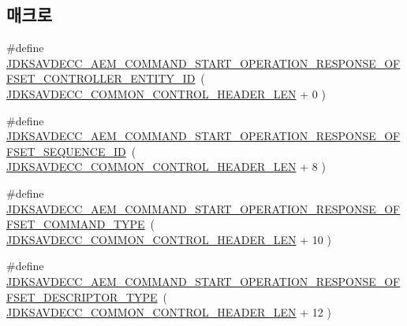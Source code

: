 \subsection*{매크로}
\begin{DoxyCompactItemize}
\item 
\#define \hyperlink{group__command__start__operation__response_ga738a0042fd569fe2e23a629809b88dbd}{J\+D\+K\+S\+A\+V\+D\+E\+C\+C\+\_\+\+A\+E\+M\+\_\+\+C\+O\+M\+M\+A\+N\+D\+\_\+\+S\+T\+A\+R\+T\+\_\+\+O\+P\+E\+R\+A\+T\+I\+O\+N\+\_\+\+R\+E\+S\+P\+O\+N\+S\+E\+\_\+\+O\+F\+F\+S\+E\+T\+\_\+\+C\+O\+N\+T\+R\+O\+L\+L\+E\+R\+\_\+\+E\+N\+T\+I\+T\+Y\+\_\+\+ID}~( \hyperlink{group__jdksavdecc__avtp__common__control__header_gaae84052886fb1bb42f3bc5f85b741dff}{J\+D\+K\+S\+A\+V\+D\+E\+C\+C\+\_\+\+C\+O\+M\+M\+O\+N\+\_\+\+C\+O\+N\+T\+R\+O\+L\+\_\+\+H\+E\+A\+D\+E\+R\+\_\+\+L\+EN} + 0 )
\item 
\#define \hyperlink{group__command__start__operation__response_ga69fb183ebf0609c2958fa8564b288f9e}{J\+D\+K\+S\+A\+V\+D\+E\+C\+C\+\_\+\+A\+E\+M\+\_\+\+C\+O\+M\+M\+A\+N\+D\+\_\+\+S\+T\+A\+R\+T\+\_\+\+O\+P\+E\+R\+A\+T\+I\+O\+N\+\_\+\+R\+E\+S\+P\+O\+N\+S\+E\+\_\+\+O\+F\+F\+S\+E\+T\+\_\+\+S\+E\+Q\+U\+E\+N\+C\+E\+\_\+\+ID}~( \hyperlink{group__jdksavdecc__avtp__common__control__header_gaae84052886fb1bb42f3bc5f85b741dff}{J\+D\+K\+S\+A\+V\+D\+E\+C\+C\+\_\+\+C\+O\+M\+M\+O\+N\+\_\+\+C\+O\+N\+T\+R\+O\+L\+\_\+\+H\+E\+A\+D\+E\+R\+\_\+\+L\+EN} + 8 )
\item 
\#define \hyperlink{group__command__start__operation__response_ga1505b0f17f33dc59412e774d4444c8a6}{J\+D\+K\+S\+A\+V\+D\+E\+C\+C\+\_\+\+A\+E\+M\+\_\+\+C\+O\+M\+M\+A\+N\+D\+\_\+\+S\+T\+A\+R\+T\+\_\+\+O\+P\+E\+R\+A\+T\+I\+O\+N\+\_\+\+R\+E\+S\+P\+O\+N\+S\+E\+\_\+\+O\+F\+F\+S\+E\+T\+\_\+\+C\+O\+M\+M\+A\+N\+D\+\_\+\+T\+Y\+PE}~( \hyperlink{group__jdksavdecc__avtp__common__control__header_gaae84052886fb1bb42f3bc5f85b741dff}{J\+D\+K\+S\+A\+V\+D\+E\+C\+C\+\_\+\+C\+O\+M\+M\+O\+N\+\_\+\+C\+O\+N\+T\+R\+O\+L\+\_\+\+H\+E\+A\+D\+E\+R\+\_\+\+L\+EN} + 10 )
\item 
\#define \hyperlink{group__command__start__operation__response_ga11fb83edf9712434fc570ceee2e91b16}{J\+D\+K\+S\+A\+V\+D\+E\+C\+C\+\_\+\+A\+E\+M\+\_\+\+C\+O\+M\+M\+A\+N\+D\+\_\+\+S\+T\+A\+R\+T\+\_\+\+O\+P\+E\+R\+A\+T\+I\+O\+N\+\_\+\+R\+E\+S\+P\+O\+N\+S\+E\+\_\+\+O\+F\+F\+S\+E\+T\+\_\+\+D\+E\+S\+C\+R\+I\+P\+T\+O\+R\+\_\+\+T\+Y\+PE}~( \hyperlink{group__jdksavdecc__avtp__common__control__header_gaae84052886fb1bb42f3bc5f85b741dff}{J\+D\+K\+S\+A\+V\+D\+E\+C\+C\+\_\+\+C\+O\+M\+M\+O\+N\+\_\+\+C\+O\+N\+T\+R\+O\+L\+\_\+\+H\+E\+A\+D\+E\+R\+\_\+\+L\+EN} + 12 )

\end{DoxyCompactItemize}
